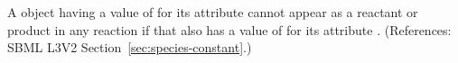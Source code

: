 A \Species object having a value of  for its attribute
 cannot appear as a reactant or product in any
reaction if that \Species also has a value of  for its attribute
.  (References: SBML L3V2
Section~\ref{sec:species-constant}.)
